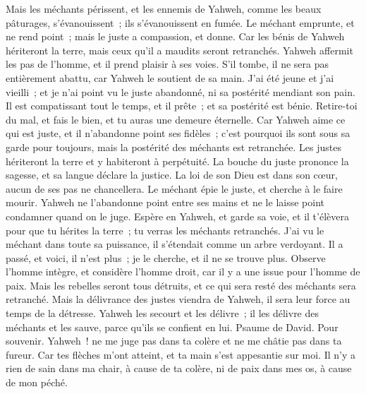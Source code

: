 \begin{multicols}{2}
 Mais les méchants périssent, et les ennemis de Yahweh, comme les beaux pâturages, s'évanouissent~; ils s'évanouissent en fumée.
 Le méchant emprunte, et ne rend point~; mais le juste a compassion, et donne.
Car les bénis de Yahweh hériteront la terre, mais ceux qu'il a maudits seront retranchés.
 Yahweh affermit les pas de l'homme, et il prend plaisir à ses voies.
S'il tombe, il ne sera pas entièrement abattu, car Yahweh le soutient de sa main.
 J'ai été jeune et j'ai vieilli~; et je n'ai point vu le juste abandonné, ni sa postérité mendiant son pain.
Il est compatissant tout le temps, et il prête~; et sa postérité est bénie.
 Retire-toi du mal, et fais le bien, et tu auras une demeure éternelle.
Car Yahweh aime ce qui est juste, et il n'abandonne point ses fidèles~; c'est pourquoi ils sont sous sa garde pour toujours, mais la postérité des méchants est retranchée.
 Les justes hériteront la terre et y habiteront à perpétuité.
 La bouche du juste prononce la sagesse, et sa langue déclare la justice.
La loi de son Dieu est dans son cœur, aucun de ses pas ne chancellera.
 Le méchant épie le juste, et cherche à le faire mourir.
Yahweh ne l'abandonne point entre ses mains et ne le laisse point condamner quand on le juge.
 Espère en Yahweh, et garde sa voie, et il t'élèvera pour que tu hérites la terre~; tu verras les méchants retranchés.
 J'ai vu le méchant dans toute sa puissance, il s'étendait comme un arbre verdoyant.
Il a passé, et voici, il n'est plus~; je le cherche, et il ne se trouve plus.
 Observe l'homme intègre, et considère l'homme droit, car il y a une issue pour l'homme de paix.
Mais les rebelles seront tous détruits, et ce qui sera resté des méchants sera retranché.
 Mais la délivrance des justes viendra de Yahweh, il sera leur force au temps de la détresse.
Yahweh les secourt et les délivre~; il les délivre des méchants et les sauve, parce qu'ils se confient en lui.
\VerseOne{}Psaume de David. Pour souvenir.
Yahweh~! ne me juge pas dans ta colère et ne me châtie pas dans ta fureur.
Car tes flèches m'ont atteint, et ta main s'est appesantie sur moi.
Il n'y a rien de sain dans ma chair, à cause de ta colère, ni de paix dans mes os, à cause de mon péché.

\end{multicols}
